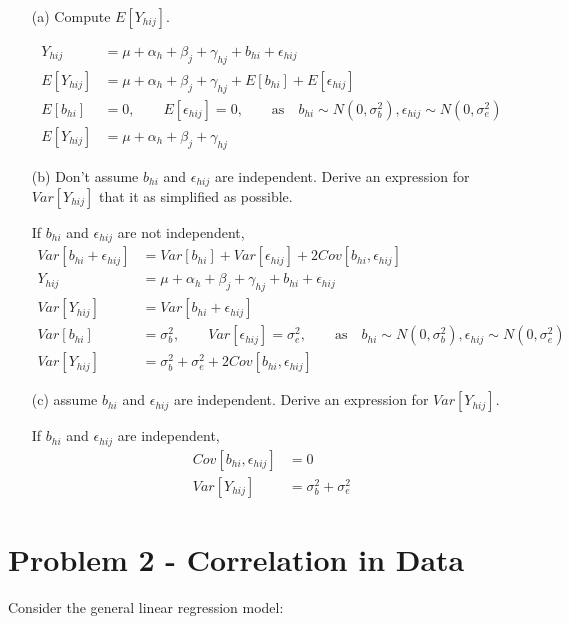 \documentclass[11pt]{article} %
\begin{document}
\begin{itemize}
\item[(a)] Compute $E[Y_{hij}]$.
	
	\begin{align*}
		Y_{hij} &= \mu + \alpha_h + \beta_j + \gamma_{hj} + b_{hi} + \epsilon_{hij} \\
		E[Y_{hij}] &= \mu + \alpha_h + \beta_j + \gamma_{hj} + E[b_{hi}] + E[\epsilon_{hij}] \\
		 E[b_{hi}] &= 0, \qquad E[\epsilon_{hij}] = 0, \qquad \text{as} \quad b_{hi} \sim N(0, \sigma^2_b), \epsilon_{hij} \sim N(0, \sigma^2_e) \\
		E[Y_{hij}] &= \mu + \alpha_h + \beta_j + \gamma_{hj} 
	\end{align*}

\item[(b)] Don't assume $b_{hi}$ and $\epsilon_{hij}$ are independent. Derive an expression for $Var[Y_{hij}]$ that it as simplified as possible.

If $b_{hi}$ and $\epsilon_{hij}$ are not independent,
\begin{align*}
	Var[b_{hi} + \epsilon_{hij}] &= Var[b_{hi}] + Var[\epsilon_{hij}] +2 Cov[b_{hi}, \epsilon_{hij}] \\
	Y_{hij} &= \mu + \alpha_h + \beta_j + \gamma_{hj} + b_{hi} + \epsilon_{hij} \\
	Var[Y_{hij}] &= Var[b_{hi} + \epsilon_{hij}] \\
	Var[b_{hi}] &= \sigma^2_b, \qquad Var[\epsilon_{hij}] = \sigma^2_e, \qquad \text{as} \quad b_{hi} \sim N(0, \sigma^2_b), \epsilon_{hij} \sim N(0, \sigma^2_e) \\
	Var[Y_{hij}] &= \sigma^2_b + \sigma^2_e + 2 Cov[b_{hi}, \epsilon_{hij}]
\end{align*}

\item[(c)] assume $b_{hi}$ and $\epsilon_{hij}$ are independent. Derive an expression for $Var[Y_{hij}]$. 

If $b_{hi}$ and $\epsilon_{hij}$ are independent,
\begin{align*}
	Cov[b_{hi}, \epsilon_{hij}] &= 0\\
	Var[Y_{hij}] &= \sigma^2_b + \sigma^2_e
\end{align*}

\end{itemize}

\section{Problem 2 - Correlation in Data}
Consider the general linear regression model:
\end{document}
